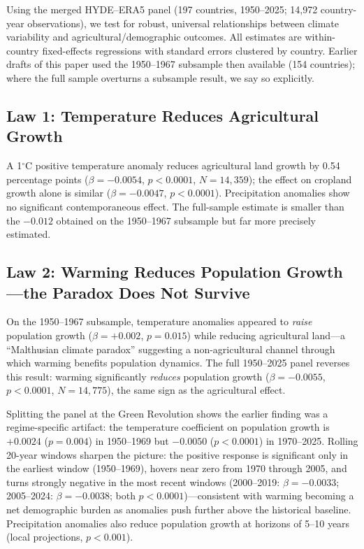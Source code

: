 \documentclass[12pt,letterpaper]{article}
\begin{document}
Using the merged HYDE--ERA5 panel (197 countries, 1950--2025; 14{,}972 country-year observations), we test for robust, universal relationships between climate variability and agricultural/demographic outcomes. All estimates are within-country fixed-effects regressions with standard errors clustered by country. Earlier drafts of this paper used the 1950--1967 subsample then available (154 countries); where the full sample overturns a subsample result, we say so explicitly.

\subsection{Law 1: Temperature Reduces Agricultural Growth}

A 1$^\circ$C positive temperature anomaly reduces agricultural land growth by 0.54 percentage points ($\beta = -0.0054$, $p < 0.0001$, $N = 14{,}359$); the effect on cropland growth alone is similar ($\beta = -0.0047$, $p < 0.0001$). Precipitation anomalies show no significant contemporaneous effect. The full-sample estimate is smaller than the $-0.012$ obtained on the 1950--1967 subsample but far more precisely estimated.

\subsection{Law 2: Warming Reduces Population Growth---the Paradox Does Not Survive}

On the 1950--1967 subsample, temperature anomalies appeared to \textit{raise} population growth ($\beta = +0.002$, $p = 0.015$) while reducing agricultural land---a ``Malthusian climate paradox'' suggesting a non-agricultural channel through which warming benefits population dynamics. The full 1950--2025 panel reverses this result: warming significantly \textit{reduces} population growth ($\beta = -0.0055$, $p < 0.0001$, $N = 14{,}775$), the same sign as the agricultural effect.

Splitting the panel at the Green Revolution shows the earlier finding was a regime-specific artifact: the temperature coefficient on population growth is $+0.0024$ ($p = 0.004$) in 1950--1969 but $-0.0050$ ($p < 0.0001$) in 1970--2025. Rolling 20-year windows sharpen the picture: the positive response is significant only in the earliest window (1950--1969), hovers near zero from 1970 through 2005, and turns strongly negative in the most recent windows (2000--2019: $\beta = -0.0033$; 2005--2024: $\beta = -0.0038$; both $p < 0.0001$)---consistent with warming becoming a net demographic burden as anomalies push further above the historical baseline. Precipitation anomalies also reduce population growth at horizons of 5--10 years (local projections, $p < 0.001$).
\end{document}
